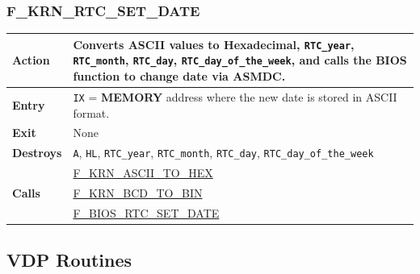 \documentclass[a4paper,11pt]{article}
\begin{document}
        \subsubsection{F\_KRN\_RTC\_SET\_DATE}
        \label{func:fkrnrtcsetdate}
        \begin{tabular}{l p{9cm}}
            \hline\textbf{Action}
            & Converts ASCII values to Hexadecimal, \texttt{RTC\_year},
            \texttt{RTC\_month}, \texttt{RTC\_day}, \texttt{RTC\_day\_of\_the\_week},
            and calls the BIOS function to change date via \textbf{ASMDC}.\\
            \hline\textbf{Entry} & \texttt{IX} = \textbf{MEMORY} address where
            the new date is stored in ASCII format.\\
            \hline\textbf{Exit} & None \\
            \hline\textbf{Destroys} & \texttt{A}, \texttt{HL}, \texttt{RTC\_year},
            \texttt{RTC\_month}, \texttt{RTC\_day}, \texttt{RTC\_day\_of\_the\_week}\\
            \hline\multirow[t]{3}{4em}{\textbf{Calls}}
            & \hyperref[func:fkrnasciitohex]{F\_KRN\_ASCII\_TO\_HEX}\\
            & \hyperref[func:fkrnbcdtobin]{F\_KRN\_BCD\_TO\_BIN}\\
            & \hyperref[func:fbiosrtcsetdate]{F\_BIOS\_RTC\_SET\_DATE}\\
            \hline
        \end{tabular}

    \subsection{VDP Routines}

\end{document}
